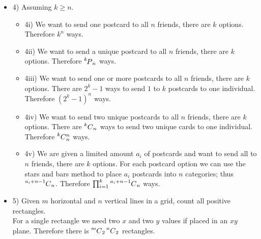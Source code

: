 \documentclass[ 12pt ]{article}
\newcommand\Myperm[2][^n]{\prescript{#1\mkern-2.5mu}{}P_{#2}}
\newcommand\Mycomb[2][^n]{\prescript{#1\mkern-0.5mu}{}C_{#2}}
\begin{document}
\begin{itemize}
	\item[] {\large 4)}
	Assuming $k \geq n$.
	\begin{itemize}
		\item[] {\large 4i)}
		We want to send one postcard to all $n$ friends, there are $k$ options. Therefore $k^n$ ways.

		\item[] {\large 4ii)}
		We want to send a unique postcard to all $n$ friends, there are $k$ options. Therefore $\Myperm[k]{n}$ ways.

		\item[] {\large 4iii)}
		We want to send one or more postcards to all $n$ friends, there are $k$ options. There are $2^k - 1$ ways to send
		$1$ to $k$ postcards to one individual. Therefore $(2^k - 1)^n$ ways.

		\item[] {\large 4iv)}
		We want to send two unique postcards to all $n$ friends, there are $k$ options. There are $\Mycomb[k]{n}$
		ways to send two unique cards to one individual. Therefore $\Mycomb[k]{n}^n$ ways.

		\item[] {\large 4v)}
		We are given a limited amount $a_i$ of postcards and want to send all to $n$ friends, there are $k$ options. For
		each postcard option we can use the stars and bars method to place $a_i$ postcards into $n$ categories; thus
		$\Mycomb[a_i+n-1]{n}$. Therefore $\prod_{i=1}^k \Mycomb[a_i+n-1]{n}$ ways.
	\end{itemize}

	\item[] {\large 5)}
	Given $m$ horizontal and $n$ vertical lines in a grid, count all positive rectangles. \\
	For a single rectangle we need two $x$ and two $y$ values if placed in an $xy$ plane. Therefore there is
	$\Mycomb[m]{2}\Mycomb[n]{2}$ rectangles.
	\newpage


\end{itemize}
\end{document}
